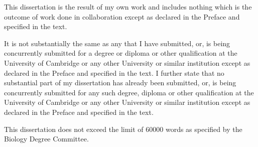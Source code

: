 This dissertation is the result of my own work and includes nothing which is the outcome of work done in collaboration except as declared in the Preface and specified in the text.

It is not substantially the same as any that I have submitted, or, is being concurrently submitted for a degree or diploma or other qualification at the University of Cambridge or any other University or similar institution except as declared in the Preface and specified in the text. I further state that no substantial part of my dissertation has already been submitted, or, is being concurrently submitted for any such degree, diploma or other qualification at the University of Cambridge or any other University or similar institution except as declared in the Preface and specified in the text. 

This dissertation does not exceed the limit of \num{60000} words as specified by the Biology Degree Committee.
